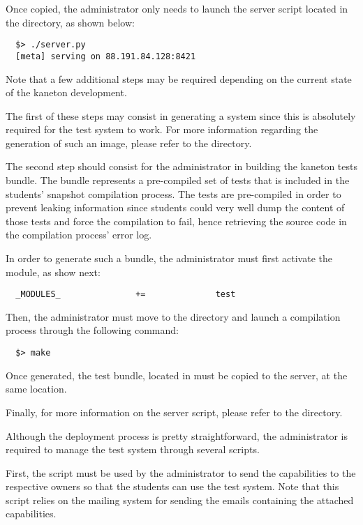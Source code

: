 Once copied, the administrator only needs to launch the server script located
in the  directory, as shown below:

\begin{verbatim}
  $> ./server.py
  [meta] serving on 88.191.84.128:8421
\end{verbatim}

Note that a few additional steps may be required depending on the current state
of the kaneton development.

The first of these steps may consist in generating a  system
since this is absolutely required for the test system to work. For more
information regarding the generation of such an image, please refer to the
 directory.

The second step should consist for the administrator in building the kaneton
tests bundle. The bundle represents a pre-compiled set of tests that is
included in the students' snapshot compilation process. The tests are
pre-compiled in order to prevent leaking information since students could
very well dump the content of those tests and force the compilation to fail,
hence retrieving the source code in the compilation process' error log.

In order to generate such a bundle, the administrator must first activate
the  module, as show next:

\begin{verbatim}
  _MODULES_               +=              test
\end{verbatim}

Then, the administrator must move to the  directory
and launch a compilation process through the following command:

\begin{verbatim}
  $> make
\end{verbatim}

Once generated, the test bundle, located in 
must be copied to the server, at the same location.

Finally, for more information on the server script, please refer to the
 directory.


Although the deployment process is pretty straightforward, the administrator
is required to manage the test system through several scripts.

First, the  script must be used by the administrator to send
the capabilities to the respective owners so that the students can use
the test system. Note that this script relies on the  mailing
system for sending the emails containing the attached capabilities.

